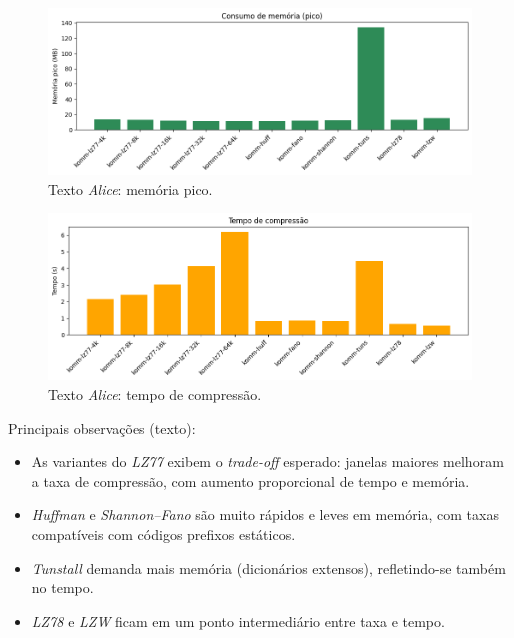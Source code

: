 \begin{figure}[h]
  \centering
  \caption{Texto \textit{Alice}: memória pico.}
  \label{fig:komm-alice-memory}
  \includegraphics[width=15cm]{figuras/komm_alice_memory.png}
\end{figure}

\begin{figure}[h]
  \centering
  \caption{Texto \textit{Alice}: tempo de compressão.}
  \label{fig:komm-alice-time}
  \includegraphics[width=15cm]{figuras/komm_alice_time.png}
\end{figure}

Principais observações (texto):
\begin{itemize}
  \item As variantes do \textit{LZ77} exibem o \emph{trade-off} esperado: janelas maiores melhoram a taxa de compressão, com aumento proporcional de tempo e memória.
  \item \textit{Huffman} e \textit{Shannon--Fano} são muito rápidos e leves em memória, com taxas compatíveis com códigos prefixos estáticos.
  \item \textit{Tunstall} demanda mais memória (dicionários extensos), refletindo-se também no tempo.
  \item \textit{LZ78} e \textit{LZW} ficam em um ponto intermediário entre taxa e tempo.
\end{itemize}

